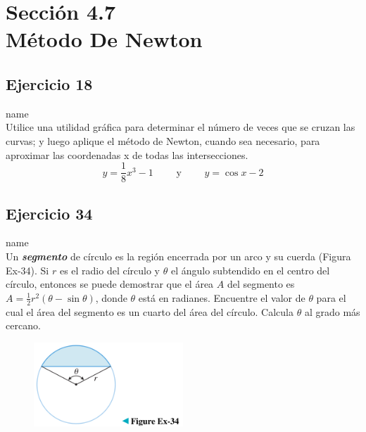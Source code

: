 \documentclass[12pt]{article}
\begin{document}
\section{Sección 4.7 \\ Método De Newton}
\subsection{Ejercicio 18} name \\

Utilice una utilidad gráfica para determinar el número de veces que se cruzan las curvas; y luego aplique el método de Newton, cuando sea necesario, para aproximar las coordenadas x de todas las intersecciones.
\[
y=\frac{1}{8}x^3-1 \qquad \text{ y } \qquad y=\cos{x}-2
\]

\subsection{Ejercicio 34} name \\

Un \textit{\textbf{segmento}} de círculo es la región encerrada por un arco y su cuerda (Figura Ex-34). Si $r$ es el radio del círculo y $\theta$ el ángulo subtendido en el centro del círculo, entonces se puede demostrar que el área $A$ del segmento es $A = \frac{1}{2} r^2 (\theta - \sin{\theta})$, donde $\theta$ está en radianes. Encuentre el valor de $\theta$ para el cual el área del segmento es un cuarto del área del círculo. Calcula $\theta$ al grado más cercano.

\begin{figure}[H]
\centering
\includegraphics[width=0.5\textwidth]{../img/img_Lista3/3_34.png}
\end{figure}
\end{document}
